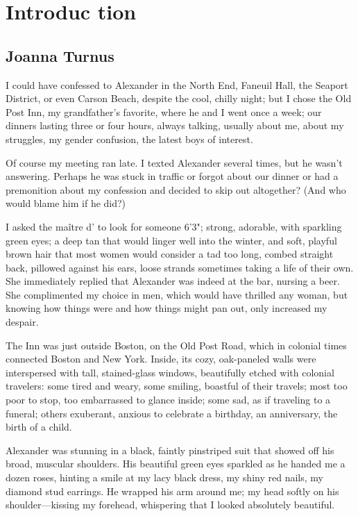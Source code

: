 \part*{Introduc\kern1pt tion}

\chapter*{Joanna Turnus}

\titlemark{}

I could have confessed to Alexander in the North End, Faneuil Hall, the
Seaport District, or even Carson Beach, despite the cool, chilly night;
but I chose the Old Post Inn, my grandfather's favorite, where he and I
went once a week; our dinners lasting three or four hours, always
talking, usually about me, about my struggles, my gender confusion, the
latest boys of interest.

Of course my meeting ran late. I texted Alexander several times, but he
wasn't answering. Perhaps he was stuck in traffic or forgot about our
dinner or had a premonition about my confession and decided to skip out
altogether? (And who would blame him if he did?)

I asked the maître d' to look for someone 6'3"; strong, adorable, with
sparkling green eyes; a deep tan that would linger well into the winter,
and soft, playful brown hair that most women would consider a tad too
long, combed straight back, pillowed against his ears, loose strands
sometimes taking a life of their own. She immediately replied that
Alexander was indeed at the bar, nursing a beer. She complimented my
choice in men, which would have thrilled any woman, but knowing how
things were and how things might pan out, only increased my despair.

The Inn was just outside Boston, on the Old Post Road, which in colonial
times connected Boston and New York. Inside, its cozy, oak-paneled walls
were interspersed with tall, stained-glass windows, beautifully etched
with colonial travelers: some tired and weary, some smiling, boastful of
their travels; most too poor to stop, too embarrassed to glance inside;
some sad, as if traveling to a funeral; others exuberant, anxious to
celebrate a birthday, an anniversary, the birth of a child.

Alexander was stunning in a black, faintly pinstriped suit that showed
off his broad, muscular shoulders. His beautiful green eyes sparkled as
he handed me a dozen roses, hinting a smile at my lacy black dress, my
shiny red nails, my diamond stud earrings. He wrapped his arm around me;
my head softly on his shoulder---kissing my forehead, whispering that I
looked absolutely beautiful.

